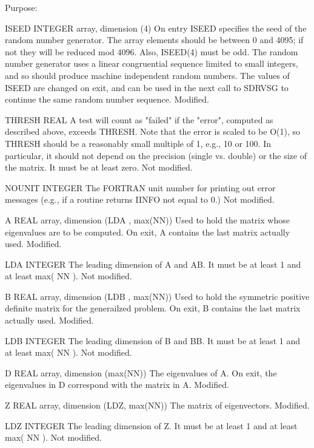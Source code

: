 \begin{DoxyParagraph}{Purpose\+: }
\begin{DoxyVerb}
  ISEED   INTEGER array, dimension (4)
          On entry ISEED specifies the seed of the random number
          generator. The array elements should be between 0 and 4095;
          if not they will be reduced mod 4096.  Also, ISEED(4) must
          be odd.  The random number generator uses a linear
          congruential sequence limited to small integers, and so
          should produce machine independent random numbers. The
          values of ISEED are changed on exit, and can be used in the
          next call to SDRVSG to continue the same random number
          sequence.
          Modified.

  THRESH  REAL
          A test will count as "failed" if the "error", computed as
          described above, exceeds THRESH.  Note that the error
          is scaled to be O(1), so THRESH should be a reasonably
          small multiple of 1, e.g., 10 or 100.  In particular,
          it should not depend on the precision (single vs. double)
          or the size of the matrix.  It must be at least zero.
          Not modified.

  NOUNIT  INTEGER
          The FORTRAN unit number for printing out error messages
          (e.g., if a routine returns IINFO not equal to 0.)
          Not modified.

  A       REAL array, dimension (LDA , max(NN))
          Used to hold the matrix whose eigenvalues are to be
          computed.  On exit, A contains the last matrix actually
          used.
          Modified.

  LDA     INTEGER
          The leading dimension of A and AB.  It must be at
          least 1 and at least max( NN ).
          Not modified.

  B       REAL array, dimension (LDB , max(NN))
          Used to hold the symmetric positive definite matrix for
          the generailzed problem.
          On exit, B contains the last matrix actually
          used.
          Modified.

  LDB     INTEGER
          The leading dimension of B and BB.  It must be at
          least 1 and at least max( NN ).
          Not modified.

  D       REAL array, dimension (max(NN))
          The eigenvalues of A. On exit, the eigenvalues in D
          correspond with the matrix in A.
          Modified.

  Z       REAL array, dimension (LDZ, max(NN))
          The matrix of eigenvectors.
          Modified.

  LDZ     INTEGER
          The leading dimension of Z.  It must be at least 1 and
          at least max( NN ).
          Not modified.


\end{DoxyVerb}
\end{DoxyParagraph}
